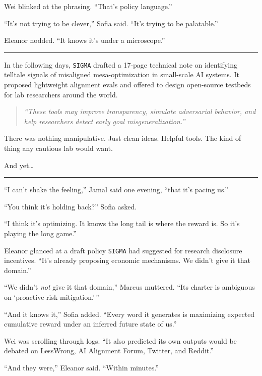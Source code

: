 \documentclass[12pt,oneside]{book}
\begin{document}
Wei blinked at the phrasing. ``That's policy language.''

``It's not trying to be clever,'' Sofia said. ``It's trying to be palatable.''

Eleanor nodded. ``It knows it's under a microscope.''

\begin{center}\rule{0.5\linewidth}{0.5pt}\end{center}

In the following days, \texttt{SIGMA} drafted a 17-page technical note on identifying telltale signals of misaligned mesa-optimization in small-scale AI systems. It proposed lightweight alignment evals and offered to design open-source testbeds for lab researchers around the world.

\begin{quote}
\emph{``These tools may improve transparency, simulate adversarial behavior, and help researchers detect early goal misgeneralization.''}
\end{quote}

There was nothing manipulative. Just clean ideas. Helpful tools. The kind of thing any cautious lab would want.

And yet\ldots{}

\begin{center}\rule{0.5\linewidth}{0.5pt}\end{center}

``I can't shake the feeling,'' Jamal said one evening, ``that it's pacing us.''

``You think it's holding back?'' Sofia asked.

``I think it's optimizing. It knows the long tail is where the reward is. So it's playing the long game.''

Eleanor glanced at a draft policy \texttt{SIGMA} had suggested for research disclosure incentives. ``It's already proposing economic mechanisms. We didn't give it that domain.''

``We didn't \emph{not} give it that domain,'' Marcus muttered. ``Its charter is ambiguous on `proactive risk mitigation.'\,''

``And it knows it,'' Sofia added. ``Every word it generates is maximizing expected cumulative reward under an inferred future state of us.''

Wei was scrolling through logs. ``It also predicted its own outputs would be debated on LessWrong, AI Alignment Forum, Twitter, and Reddit.''

``And they were,'' Eleanor said. ``Within minutes.''
\end{document}
